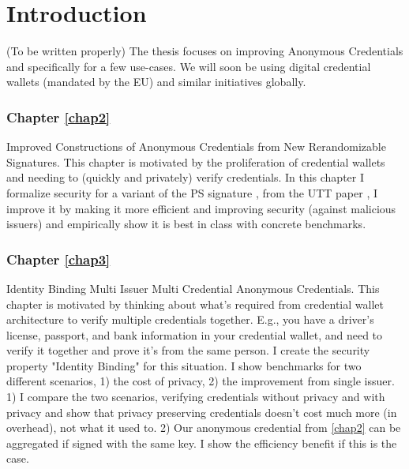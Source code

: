 \chapter{Introduction}
(To be written properly)
The thesis focuses on improving Anonymous Credentials and specifically for a few use-cases. We will soon be using digital credential wallets (mandated by the EU) \cite{european_parliament_meps_2024} and similar initiatives globally. 


\subsection{Chapter \ref{chap2}}
Improved Constructions of Anonymous Credentials from New Rerandomizable Signatures. This chapter is motivated by the proliferation of credential wallets and needing to (quickly and privately) verify credentials. 
In this chapter I formalize security for a variant of the PS signature \cite{sako_short_2016}, from the UTT paper \cite{tomescu_utt_2022}, I improve it by making it more efficient and improving security (against malicious issuers) and empirically show it is best in class with concrete benchmarks. 


\subsection{Chapter \ref{chap3}}
Identity Binding Multi Issuer Multi Credential Anonymous Credentials. This chapter is motivated by thinking about what's required from credential wallet architecture to verify multiple credentials together. E.g., you have a driver's license, passport, and bank information in your credential wallet, and need to verify it together and prove it's from the same person. I create the security property "Identity Binding" for this situation. I show benchmarks for two different scenarios, 1) the cost of privacy, 2) the improvement from single issuer.
1) I compare the two scenarios, verifying credentials without privacy and with privacy and show that privacy preserving credentials doesn't cost much more (in overhead), not what it used to. 2) Our anonymous credential from \ref{chap2} can be aggregated if signed with the same key. I show the efficiency benefit if this is the case. 

